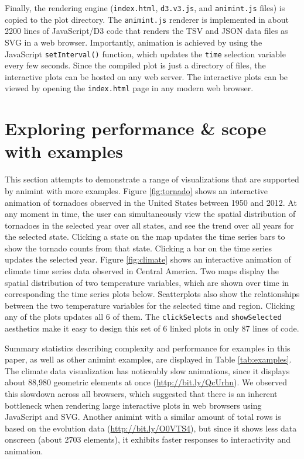 \documentclass[12pt,]{article}
\theoremstyle{definition}
\theoremstyle{definition}
\theoremstyle{remark}
\begin{document}
Finally, the rendering engine (\texttt{index.html}, \texttt{d3.v3.js},
and \texttt{animint.js} files) is copied to the plot directory. The
\texttt{animint.js} renderer is implemented in about 2200 lines of
JavaScript/D3 code that renders the TSV and JSON data files as SVG in a
web browser. Importantly, animation is achieved by using the JavaScript
\texttt{setInterval()} function, which updates the \texttt{time}
selection variable every few seconds. Since the compiled plot is just a
directory of files, the interactive plots can be hosted on any web
server. The interactive plots can be viewed by opening the
\texttt{index.html} page in any modern web browser.

\section{Exploring performance \& scope with
examples}\label{performance}

This section attempts to demonstrate a range of visualizations that are
supported by animint with more examples. Figure \ref{fig:tornado} shows
an interactive animation of tornadoes observed in the United States
between 1950 and 2012. At any moment in time, the user can
simultaneously view the spatial distribution of tornadoes in the
selected year over all states, and see the trend over all years for the
selected state. Clicking a state on the map updates the time series bars
to show the tornado counts from that state. Clicking a bar on the time
series updates the selected year. Figure \ref{fig:climate} shows an
interactive animation of climate time series data observed in Central
America. Two maps display the spatial distribution of two temperature
variables, which are shown over time in corresponding the time series
plots below. Scatterplots also show the relationships between the two
temperature variables for the selected time and region. Clicking any of
the plots updates all 6 of them. The \texttt{clickSelects} and
\texttt{showSelected} aesthetics make it easy to design this set of 6
linked plots in only 87 lines of code.

Summary statistics describing complexity and performance for examples in
this paper, as well as other animint examples, are displayed in Table
\ref{tab:examples}. The climate data visualization has noticeably slow
animations, since it displays about 88,980 geometric elements at once
(\url{http://bit.ly/QcUrhn}). We observed this slowdown across all
browsers, which suggested that there is an inherent bottleneck when
rendering large interactive plots in web browsers using JavaScript and
SVG. Another animint with a similar amount of total rows is based on the
evolution data (\url{http://bit.ly/O0VTS4}), but since it shows less
data onscreen (about 2703 elements), it exhibits faster responses to
interactivity and animation.
\end{document}
